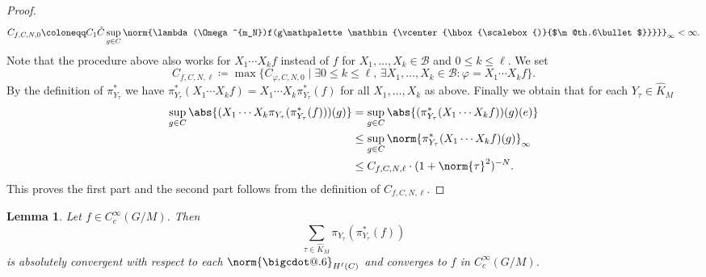 \documentclass[JEP,XML,SOM,NoFloatCountersInSection,Unicode,published]{cedram}
\makeatletter
\newtheorem{lemma}[theorem]{Lemma}
\theoremstyle{definition}
\DeclarePairedDelimiter{\abs}\lvert\rvert
\DeclarePairedDelimiter{\norm}\lVert\rVert
\newcommand{\sn}[3]{\ensuremath{\norm{#3}_{H^{#1}(#2)}}}
\newcommand*\bigcdot{\mathpalette\bigcdot@{.6}}%
\newcommand*\bigcdott{\mathpalette\bigcdot@{.6}}%
\newcommand*\bigcdot@[2]{\mathbin{\vcenter{\hbox{\scalebox{#2}{$\m@th#1\bullet$}}}}}
\newcommand{\mc}[1]{\ensuremath{\mathcal{#1}}}
\makeatother
\begin{document}
\begin{proof}
\[
C_{f,C,N,0}\coloneqq C_1\tilde C\sup_{g\in C}\norm{\lambda(\Omega^{m_N})f(g\bigcdott)}_\infty<\infty.
\]
Note that the procedure above also works for $X_1\!\cdots\! X_k f$ instead of $f$ for \hbox{$X_1,\ldots,X_k\!\in\!\mc B$} and $0\leq k\leq\ell$. We set
\[
C_{f,C,N,\ell}\coloneqq\max\{C_{\varphi,C,N,0}\mid\exists 0\leq k\leq\ell,\,\exists X_1,\ldots,X_k\in\mc B\colon\varphi=X_1\cdots X_kf\}.
\]
By the definition of $\pi_{Y_\tau}^*$ we have $\pi_{Y_\tau}^*(X_1\cdots X_kf)=X_1\cdots X_k\pi_{Y_\tau}^*(f)$ for all $X_1,\ldots,X_k$ as above. Finally we obtain that for each $Y_\tau\in\hat K_M$
\begin{align*}
\sup_{g\in C}\abs{(X_1\cdots X_k\pi_{Y_\tau}(\pi_{Y_\tau}^*(f)))(g)}&=
\sup_{g\in C}\abs{(\pi_{Y_\tau}^*(X_1\cdots X_kf))(g)(e)}\\
&\leq\sup_{g\in C}\norm{\pi_{Y_\tau}^*(X_1\cdots X_kf)(g)}_\infty\\
&\leq C_{f,C,N,\ell}\cdot (1+\norm{\tau}^2)^{-N}.
\end{align*}
This proves the first part and the second part follows from the definition of $C_{f,C,N,\ell}$.
\end{proof}

\begin{lemma}\label{la:fourier_C_c}
Let $f\in C_c^\infty(G/M)$. Then
\begin{equation}\label{eq:la_series}
\sum_{\tau\in\hat K_M}\pi_{Y_\tau}(\pi_{Y_\tau}^*(f))
\end{equation}
is absolutely convergent with respect to each $\sn{\ell}{C}{\bigcdot}$ and converges to $f$ in $C_c^\infty(G/M)$.
\end{lemma}
\end{document}
